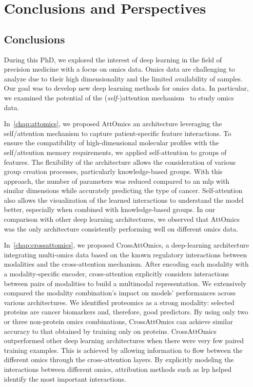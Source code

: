 \documentclass[../main.tex]{subfiles}
\begin{document}
\chapter{Conclusions and Perspectives}
\minitocpage
\section{Conclusions}
	During this PhD, we explored the interest of deep learning in the field of precision medicine with a focus on omics data.
	Omics data are challenging to analyze due to their high dimensionality and the limited availability of samples.
	Our goal was to develop new deep learning methods for omics data.
	In particular, we examined the potential of the (\emph{self-})attention mechanism~\cite{AttentionAllYouNeed} to study omics data.

	In~\cref{chap:attomics}, we proposed AttOmics an architecture leveraging the self\-/attention mechanism to capture patient-specific feature interactions.
	To ensure the compatibility of high-dimensional molecular profiles with the self\-/attention memory requirements, we applied self-attention to groups of features.
	The flexibility of the architecture allows the consideration of various group creation processes, particularly knowledge-based groups.
	With this approach, the number of parameters was reduced compared to an \gls{mlp} with similar dimensions while accurately predicting the type of cancer.
	Self-attention also allows the visualization of the learned interactions to understand the model better, especially when combined with knowledge-based groups.
	In our comparison with other deep learning architectures, we observed that AttOmics was the only architecture consistently performing well on different omics data.

	In~\cref{chap:crossattomics}, we proposed CrossAttOmics, a deep-learning architecture integrating multi-omics data based on the known regulatory interactions between modalities and the cross-attention mechanism.
	After encoding each modality with a modality-specific encoder, cross-attention explicitly considers interactions between pairs of modalities to build a multimodal representation.
	We extensively compared the modality combination's impact on models' performances across various architectures.
	We identified proteomics as a strong modality: selected proteins are cancer biomarkers and, therefore, good predictors.
	By using only two or three non-protein omics combinations, CrossAttOmics can achieve similar accuracy to that obtained by training only on proteins.
	CrossAttOmics outperformed other deep learning architectures when there were very few paired training examples.
	This is achieved by allowing information to flow between the different omics through the cross-attention layers.
	By explicitly modeling the interactions between different omics, attribution methods such as \gls{lrp} helped identify the most important interactions.
\end{document}
